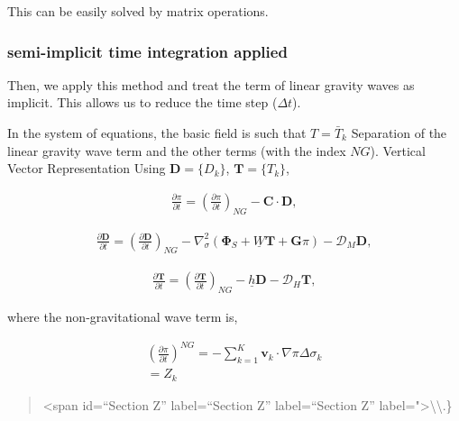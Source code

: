 This can be easily solved by matrix operations.

\hypertarget{semi-implicit-time-integration-applied}{%
\subsubsection{semi-implicit time integration
applied}\label{semi-implicit-time-integration-applied}}

Then, we apply this method and treat the term of linear gravity waves as
implicit. This allows us to reduce the time step (\(\Delta t\)).

In the system of equations, the basic field is such that \(T=\bar{T}_k\)
Separation of the linear gravity wave term and the other terms (with the
index \(NG\)). Vertical Vector Representation Using
\(\mathbf{D}=\{ D_{k} \}\), \(\mathbf{T}=\{ T_{k} \}\),

\begin{eqnarray}
   \frac{\partial \pi}{\partial t} = 
          \left( \frac{\partial \pi}{\partial t} \right)_{NG}  
     - \mathbf{C} \cdot \mathbf{D}  ,
\end{eqnarray}

\begin{eqnarray}
  \frac{\partial \mathbf{D}}{\partial t} = 
          \left( \frac{\partial \mathbf{D}}{\partial t} \right)_{NG}  
          - \nabla^{2}_{\sigma} ( \mathbf{\Phi}_{S} 
                                  + \underline{W} \mathbf{T}
                                  + \mathbf{G} \pi )  
          - {\mathcal D}_M \mathbf{D} ,
\end{eqnarray}

\begin{eqnarray}
  \frac{\partial \mathbf{T}}{\partial t} 
      =   \left( \frac{\partial \mathbf{T}}
                        {\partial t}       \right)_{NG}  
         - \underline{h} \mathbf{D}
         - {\mathcal D}_H \mathbf{T} ,
\end{eqnarray}

where the non-gravitational wave term is,

\begin{eqnarray}
  \left( \frac{\partial \pi}{\partial t} \right)^{NG}
   =   - \sum_{k=1}^{K} \mathbf{v}_{k} \cdot \nabla \pi  
       \Delta  \sigma_{k}  \\
   =   Z_{k}
\end{eqnarray}

\begin{quote}
\textless span id=``Section Z'' label=``Section Z'' label=``Section Z''
label="\textgreater\textbackslash\textbackslash.\}
\end{quote}

